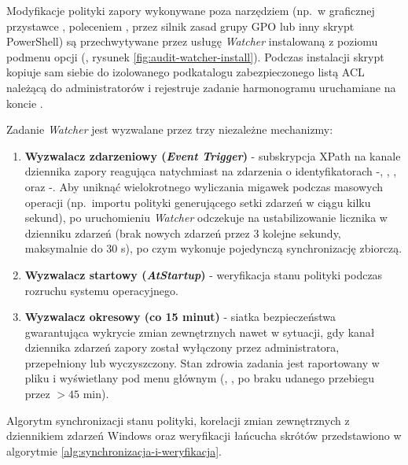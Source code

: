Modyfikacje polityki zapory wykonywane poza narzędziem (np.\ w graficznej przystawce , poleceniem , przez silnik zasad grupy GPO lub inny skrypt PowerShell) są przechwytywane przez usługę \textit{Watcher} instalowaną z poziomu podmenu opcji  (, rysunek \ref{fig:audit-watcher-install}). Podczas instalacji skrypt kopiuje sam siebie do izolowanego podkatalogu  zabezpieczonego listą ACL należącą do administratorów i rejestruje zadanie harmonogramu \code{\FirewallAudit\Watcher} uruchamiane na koncie .

Zadanie \textit{Watcher} jest wyzwalane przez trzy niezależne mechanizmy:
\begin{enumerate}
    \item \textbf{Wyzwalacz zdarzeniowy (\textit{Event Trigger})} - subskrypcja XPath na kanale dziennika zapory reagująca natychmiast na zdarzenia o identyfikatorach -, , ,  oraz -. Aby uniknąć wielokrotnego wyliczania migawek podczas masowych operacji (np.\ importu polityki generującego setki zdarzeń w ciągu kilku sekund), po uruchomieniu \textit{Watcher} odczekuje na ustabilizowanie licznika  w dzienniku zdarzeń (brak nowych zdarzeń przez 3 kolejne sekundy, maksymalnie do 30 s), po czym wykonuje pojedynczą synchronizację zbiorczą.
    \item \textbf{Wyzwalacz startowy (\textit{AtStartup})} - weryfikacja stanu polityki podczas rozruchu systemu operacyjnego.
    \item \textbf{Wyzwalacz okresowy (co 15 minut)} - siatka bezpieczeństwa gwarantująca wykrycie zmian zewnętrznych nawet w sytuacji, gdy kanał dziennika zdarzeń zapory został wyłączony przez administratora, przepełniony lub wyczyszczony. Stan zdrowia zadania jest raportowany w pliku  i wyświetlany pod menu głównym (, ,  po braku udanego przebiegu przez $>45$ min).
\end{enumerate}


Algorytm synchronizacji stanu polityki, korelacji zmian zewnętrznych z dziennikiem zdarzeń Windows oraz weryfikacji łańcucha skrótów przedstawiono w algorytmie \ref{alg:synchronizacja-i-weryfikacja}.

